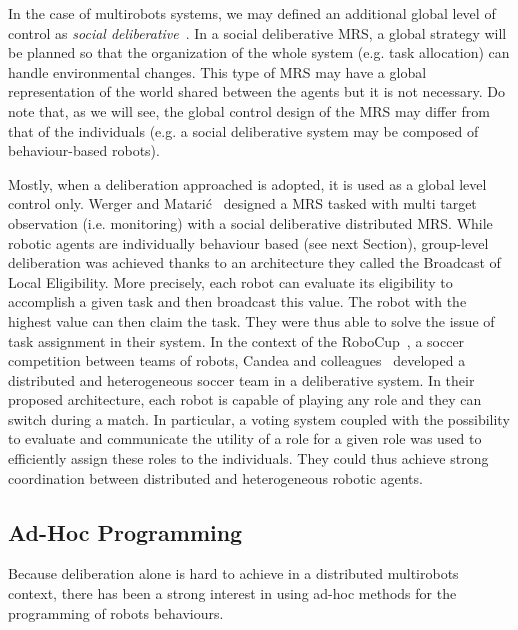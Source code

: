     In the case of multirobots systems, we may defined an additional global level of control as \emph{social deliberative}~\parencite{Iocchi2001}. In a social deliberative MRS, a global strategy will be planned so that the organization of the whole system (e.g. task allocation) can handle environmental changes. This type of MRS may have a global representation of the world shared between the agents but it is not necessary. Do note that, as we will see, the global control design of the MRS may differ from that of the individuals (e.g. a social deliberative system may be composed of behaviour-based robots).

    Mostly, when a deliberation approached is adopted, it is used as a global level control only. Werger and Matarić~\parencite{Werger2000} designed a MRS tasked with multi target observation (i.e. monitoring) with a social deliberative distributed MRS. While robotic agents are individually behaviour based (see next Section), group-level deliberation was achieved thanks to an architecture they called the Broadcast of Local Eligibility. More precisely, each robot can evaluate its eligibility to accomplish a given task and then broadcast this value. The robot with the highest value can then claim the task. They were thus able to solve the issue of task assignment in their system. In the context of the RoboCup~\parencite{Kitano1997}, a soccer competition between teams of robots, Candea and colleagues~\parencite{Candea2001} developed a distributed and heterogeneous soccer team in a deliberative system. In their proposed architecture, each robot is capable of playing any role and they can switch during a match. In particular, a voting system coupled with the possibility to evaluate and communicate the utility of a role for a given role was used to efficiently assign these roles to the individuals. They could thus achieve strong coordination between distributed and heterogeneous robotic agents.


  \subsection{Ad-Hoc Programming}

    Because deliberation alone is hard to achieve in a distributed multirobots context, there has been a strong interest in using ad-hoc methods for the programming of robots behaviours.

